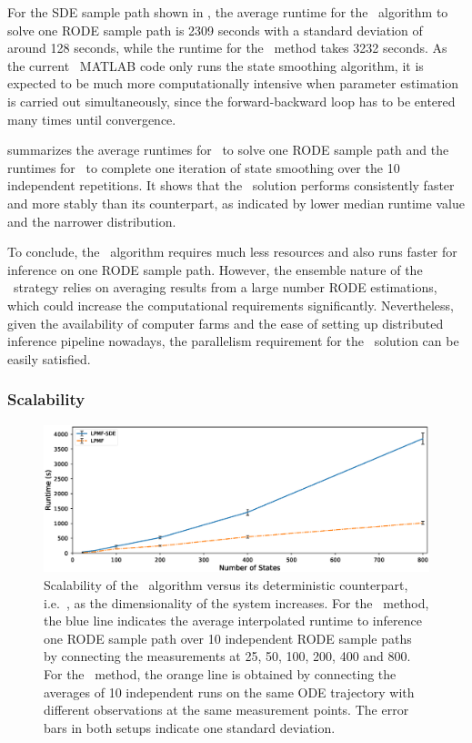For the SDE sample path shown in , the average runtime for the \algolpmfsde\ algorithm to solve one RODE sample path is 2309 seconds with a standard deviation of around 128 seconds, while the runtime for the \algovgpamf\ method takes 3232 seconds.
As the current \algovgpamf\ MATLAB code only runs the state smoothing algorithm, it is expected to be much more computationally intensive when parameter estimation is carried out simultaneously, since the forward-backward loop has to be entered many times until convergence.

 summarizes the average runtimes for \algolpmf\ to solve one RODE sample path and the runtimes for \algovgpamf\ to complete one iteration of state smoothing over the 10 independent repetitions.
It shows that the \algolpmfsde\ solution performs consistently faster and more stably than its counterpart, as indicated by lower median runtime value and the narrower distribution.

To conclude, the \algolpmfsde\ algorithm requires much less resources and also runs faster for inference on one RODE sample path.
However, the ensemble nature of the \algolpmfsde\ strategy relies on averaging results from a large number RODE estimations, which could increase the computational requirements significantly.
Nevertheless, given the availability of computer farms and the ease of setting up distributed inference pipeline nowadays, the parallelism requirement for the \algolpmfsde\ solution can be easily satisfied. 


\subsubsection*{Scalability}

\begin{figure}
    \centering
    \includegraphics[width=\textwidth]{graphics/lorenz-96-scalability}
    \caption{Scalability of the \algolpmfsde\ algorithm versus its deterministic counterpart, i.e.\ \algolpmf, as the dimensionality of the system increases. For the \algolpmfsde\ method, the blue line indicates the average interpolated runtime to inference one RODE sample path over 10 independent RODE sample paths by connecting the measurements at 25, 50, 100, 200, 400 and 800. For the \algolpmf\ method, the orange line is obtained by connecting the averages of 10 independent runs on the same ODE trajectory with different observations at the same measurement points. The error bars in both setups indicate one standard deviation.}
    \label{fig-lorenz-96-scalability}
\end{figure}

